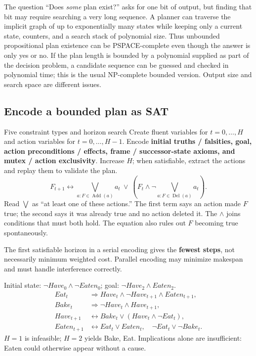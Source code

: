 \documentclass[10pt,a4paper]{article}
\newcommand{\Add}{\operatorname{Add}}
\newcommand{\Del}{\operatorname{Del}}
\begin{document}
\begin{idea}
The question ``Does \emph{some} plan exist?'' asks for one bit of output, but finding that bit may require searching a very long sequence. A planner can traverse the implicit graph of up to exponentially many states while keeping only a current state, counters, and a search stack of polynomial size. Thus unbounded propositional plan existence can be PSPACE-complete even though the answer is only yes or no. If the plan length is bounded by a polynomial supplied as part of the decision problem, a candidate sequence can be guessed and checked in polynomial time; this is the usual NP-complete bounded version. Output size and search space are different issues.
\end{idea}

\subsection{Encode a bounded plan as SAT}
\begin{card}{Five constraint types and horizon search}
Create fluent variables for $t=0,\ldots,H$ and action variables for $t=0,\ldots,H-1$. Encode \textbf{initial truths / falsities, goal, action preconditions / effects, frame / successor-state axioms, and mutex / action exclusivity}. Increase $H$; when satisfiable, extract the actions and replay them to validate the plan.
\[
F_{t+1}\leftrightarrow
\bigvee_{a:F\in\Add(a)}a_t\ \lor\
\left(F_t\land\neg\bigvee_{a:F\in\Del(a)}a_t\right).
\]
Read $\bigvee$ as ``at least one of these actions.'' The first term says an action made $F$ true; the second says it was already true and no action deleted it. The $\land$ joins conditions that must both hold. The equation also rules out $F$ becoming true spontaneously.

The first satisfiable horizon in a serial encoding gives the \textbf{fewest steps}, not necessarily minimum weighted cost. Parallel encoding may minimize makespan and must handle interference correctly.
\end{card}

\begin{idea}
Initial state: $\neg Have_0\land\neg Eaten_0$; goal: $\neg Have_2\land Eaten_2$.
\[
\begin{aligned}
Eat_t&\Rightarrow Have_t\land\neg Have_{t+1}\land Eaten_{t+1},\\
Bake_t&\Rightarrow\neg Have_t\land Have_{t+1},\\
Have_{t+1}&\leftrightarrow Bake_t\lor(Have_t\land\neg Eat_t),\\
Eaten_{t+1}&\leftrightarrow Eat_t\lor Eaten_t,\quad
\neg Eat_t\lor\neg Bake_t.
\end{aligned}
\]
$H=1$ is infeasible; $H=2$ yields Bake, Eat. Implications alone are insufficient: Eaten could otherwise appear without a cause.
\end{idea}
\end{document}
